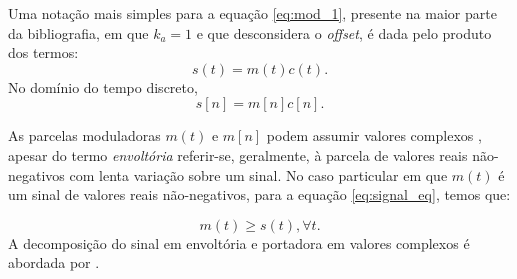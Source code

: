 
Uma notação mais simples para a equação \eqref{eq:mod_1}, presente na maior
parte da bibliografia, em que $k_a = 1$ e que desconsidera o \textit{offset}, é
dada pelo produto dos termos:
\begin{equation}
    s(t) = m(t)c(t). \label{eq:signal_eq}
\end{equation}
No domínio do tempo discreto,
\begin{equation}
    s[n] = m[n]c[n]. 
\end{equation}

As parcelas moduladoras $m(t)$ e $m[n]$ podem assumir valores complexos
 \cite{schimmel2007}, apesar do termo \textit{envoltória} referir-se,
 geralmente, à parcela de valores reais não-negativos \cite{haykin2008} com
 lenta variação sobre um sinal. No caso particular em que $m(t)$ é um sinal de
 valores reais não-negativos, para a equação \eqref{eq:signal_eq}, temos que:

\begin{equation}
    m(t) \geq s(t), \forall t.
\end{equation}
A decomposição do sinal em envoltória e portadora em valores complexos é
abordada por \citet{atlas2004}.